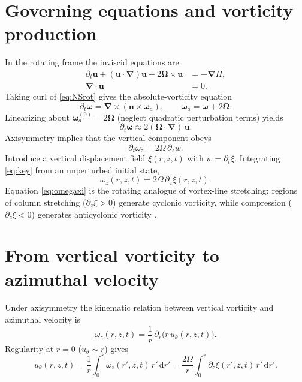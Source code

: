 \documentclass[12pt]{article}
\newcommand{\dd}{\mathrm{d}}
\newcommand{\bU}{\boldsymbol{u}}
\newcommand{\bW}{\boldsymbol{\omega}}
\newcommand{\bOm}{\boldsymbol{\Omega}}
\newcommand{\grad}{\boldsymbol{\nabla}}
\newcommand{\curl}{\boldsymbol{\nabla}\!\times}
\newcommand{\divg}{\boldsymbol{\nabla}\!\cdot}
\newcommand{\p}{\partial}
\begin{document}
    \section{Governing equations and vorticity production}
    In the rotating frame the inviscid equations are
    \begin{align}
        \p_t \bU + (\bU\!\cdot\!\grad)\bU + 2\bOm\times\bU &= -\grad \Pi,\label{eq:NSrot}\\
        \divg \bU &= 0.\label{eq:incomp}
    \end{align}
    Taking curl of \eqref{eq:NSrot} gives the absolute-vorticity equation \cite{Batchelor1967,Vallis2017}
    \begin{equation}
        \p_t \bW = \curl(\bU\times \bW_a),\qquad \bW_a=\bW+2\bOm. \label{eq:vortgen}
    \end{equation}
    Linearizing about \(\bW_a^{(0)}=2\bOm\) (neglect quadratic perturbation terms) yields
    \begin{equation}
        \p_t \bW \approx 2(\bOm\!\cdot\!\grad)\,\bU. \label{eq:vortlin}
    \end{equation}
    Axisymmetry implies that the vertical component obeys
    \begin{equation}
        \boxed{\;\p_t \omega_z = 2\Omega\,\p_z w.\;} \label{eq:key}
    \end{equation}
    Introduce a vertical displacement field \(\xi(r,z,t)\) with \(w=\p_t\xi\). Integrating \eqref{eq:key} from an unperturbed initial state,
    \begin{equation}
        \boxed{\;\omega_z(r,z,t) = 2\Omega\,\p_z \xi(r,z,t).\;} \label{eq:omegaxi}
    \end{equation}
    Equation \eqref{eq:omegaxi} is the rotating analogue of vortex-line stretching: regions of column stretching (\(\p_z\xi>0\)) generate cyclonic vorticity, while compression (\(\p_z\xi<0\)) generates anticyclonic vorticity \cite{Proudman1916,Taylor1923}.

    \section{From vertical vorticity to azimuthal velocity}
    Under axisymmetry the kinematic relation between vertical vorticity and azimuthal velocity is
    \begin{equation}
        \omega_z(r,z,t)=\frac{1}{r}\,\p_r\!\big(r\,u_\theta(r,z,t)\big). \label{eq:omegau}
    \end{equation}
    Regularity at \(r=0\) (\(u_\theta\sim r\)) gives
    \begin{equation}
        \boxed{\;
        u_\theta(r,z,t)
            =\frac{1}{r}\int_0^r \omega_z(r',z,t)\,r'\,\dd r'
            =\frac{2\Omega}{r}\int_0^r \p_z\xi(r',z,t)\,r'\,\dd r'.\;} \label{eq:uth}
    \end{equation}
\end{document}
